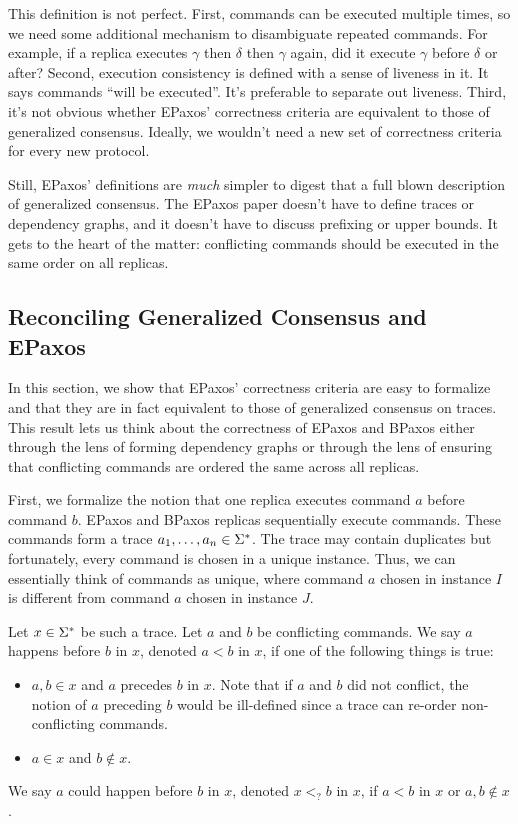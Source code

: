 This definition is not perfect. First, commands can be executed multiple times,
so we need some additional mechanism to disambiguate repeated commands. For
example, if a replica executes $\gamma$ then $\delta$ then $\gamma$ again, did
it execute $\gamma$ before $\delta$ or after? Second, execution consistency is
defined with a sense of liveness in it. It says commands ``will be executed''.
It's preferable to separate out liveness. Third, it's not obvious whether
EPaxos' correctness criteria are equivalent to those of generalized consensus.
Ideally, we wouldn't need a new set of correctness criteria for every new
protocol.

Still, EPaxos' definitions are \emph{much} simpler to digest that a full blown
description of generalized consensus. The EPaxos paper doesn't have to define
traces or dependency graphs, and it doesn't have to discuss prefixing or upper
bounds. It gets to the heart of the matter: conflicting commands should be
executed in the same order on all replicas.

\subsection{Reconciling Generalized Consensus and EPaxos}
In this section, we show that EPaxos' correctness criteria are easy to
formalize and that they are in fact equivalent to those of generalized
consensus on traces. This result lets us think about the correctness of EPaxos
and BPaxos either through the lens of forming dependency graphs or through the
lens of ensuring that conflicting commands are ordered the same across all
replicas.

First, we formalize the notion that one replica executes command $a$ before
command $b$. EPaxos and BPaxos replicas sequentially execute commands. These
commands form a trace $a_1, \ldots, a_n \in \Sigma^*$. The trace may contain
duplicates but fortunately, every command is chosen in a unique instance. Thus,
we can essentially think of commands as unique, where command $a$ chosen in
instance $I$ is different from command $a$ chosen in instance $J$.

Let $x \in \Sigma^*$ be such a trace. Let $a$ and $b$ be conflicting commands. We
say $a$ happens before $b$ in $x$, denoted $a < b$ in $x$, if one of the
following things is true:
\begin{itemize}
  \item
    $a, b \in x$ and $a$ precedes $b$ in $x$. Note that if $a$ and $b$ did not
    conflict, the notion of $a$ preceding $b$ would be ill-defined since a
    trace can re-order non-conflicting commands.

  \item
    $a \in x$ and $b \notin x$.
\end{itemize}
We say $a$ could happen before $b$ in $x$, denoted $x <_? b$ in $x$, if $a < b$
in $x$ or $a, b \notin x$.

